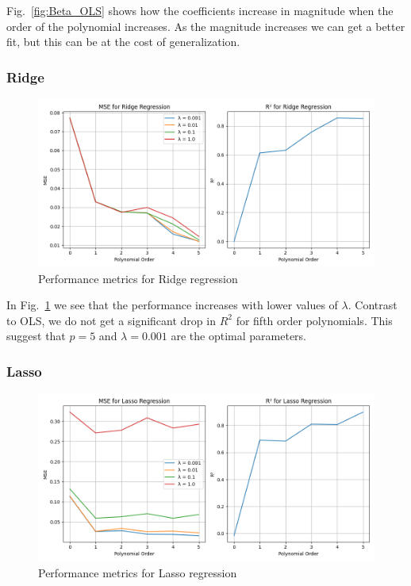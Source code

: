 \documentclass[aps,rmp,reprint,amsmath,amssymb,graphicx,longbibliography]{revtex4-1}
\begin{document}
Fig.~\ref{fig:Beta_OLS} shows how the coefficients increase in magnitude when the order of the polynomial increases. As the magnitude increases we can get a better fit, but this can be at the cost of generalization.  

\subsubsection{Ridge}
\begin{figure}[H]
    \centering
    \includegraphics[width=0.9\linewidth]{Project_1/figures/ridge_mse_r2.png}
    \caption{Performance metrics for Ridge regression}
    \label{fig:ridge_mse_r2}
\end{figure}

In Fig.~\ref{fig:ridge_mse_r2} we see that the performance increases with lower values of $\lambda$. Contrast to OLS, we do not get a significant drop in $R^2$ for fifth order polynomials. This suggest that $p = 5$ and $\lambda = 0.001$ are the optimal parameters.

\subsubsection{Lasso}

\begin{figure}[H]
    \centering
    \includegraphics[width=0.9\linewidth]{Project_1/figures/lasso_mse_r2.png}
    \caption{Performance metrics for Lasso regression}
    \label{fig:lasso_mse_r2}
\end{figure}
\end{document}
